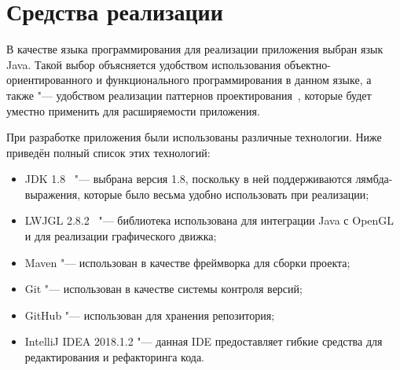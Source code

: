 \section{Средства реализации}

В качестве языка программирования для реализации приложения выбран язык Java. Такой выбор объясняется удобством
использования объектно-ориентиро\-ванного и функционального программирования в данном языке, а также "--- удобством
реализации паттернов проектирования~\cite{gamma}, которые будет уместно применить для расширяемости приложения.

При разработке приложения были использованы различные технологии. Ниже приведён полный список этих технологий:

\begin{itemize}
\item JDK 1.8~\cite{java} "--- выбрана версия 1.8, поскольку в ней поддерживаются лямбда-выражения, которые было весьма
удобно использовать при реализации;
\item LWJGL 2.8.2~\cite{lwjgl} "--- библиотека использована для интеграции Java с OpenGL и для реализации
графического движка;
\item Maven "--- использован в качестве фреймворка для сборки проекта;
\item Git "--- использован в качестве системы контроля версий;
\item GitHub "--- использован для хранения репозитория;
\item IntelliJ IDEA 2018.1.2 "--- данная IDE предоставляет гибкие средства для редактирования и рефакторинга кода.
\end{itemize}
